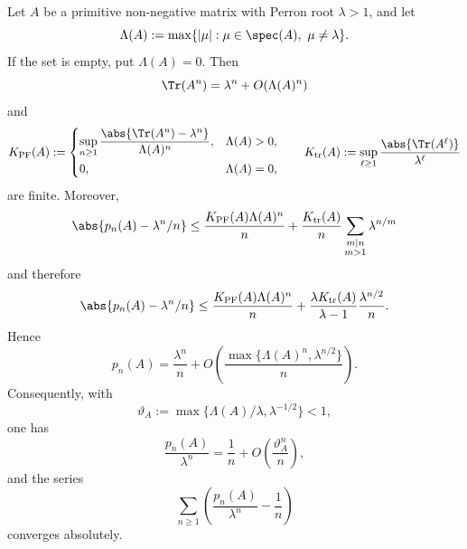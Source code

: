 \begin{lemma}
  \label{lem:primitive-orbit-asymptotic}
  Let \(A\) be a primitive non-negative matrix with Perron root
  \(\lambda>1\), and let
  \[
    \Lambda(A):=\max\{|\mu|:\mu\in\spec(A),\ \mu\neq\lambda\}.
  \]
  If the set is empty, put \(\Lambda(A)=0\).
  Then
  \[
    \Tr(A^n)=\lambda^n+O(\Lambda(A)^n)
  \]
  and
  \[
    K_{\mathrm{PF}}(A)
    :=
    \begin{cases}
      \displaystyle
      \sup_{n\ge 1}
        \frac{\abs{\Tr(A^n)-\lambda^n}}{\Lambda(A)^n},
      & \Lambda(A)>0, \\[2ex]
      0,
      & \Lambda(A)=0,
    \end{cases}
    \qquad
    K_{\mathrm{tr}}(A)
    :=
    \sup_{\ell\ge 1}\frac{\abs{\Tr(A^\ell)}}{\lambda^\ell}
  \]
  are finite. Moreover,
  \[
    \abs{p_n(A)-\lambda^n/n}
    \le
    \frac{K_{\mathrm{PF}}(A)\Lambda(A)^n}{n}
    +\frac{K_{\mathrm{tr}}(A)}{n}
      \sum_{\substack{m\mid n\\ m>1}}\lambda^{n/m}
  \]
  and therefore
  \[
    \abs{p_n(A)-\lambda^n/n}
    \le
    \frac{K_{\mathrm{PF}}(A)\Lambda(A)^n}{n}
    +\frac{\lambda K_{\mathrm{tr}}(A)}{\lambda-1}
      \frac{\lambda^{n/2}}{n}.
  \]
  Hence
  \[
    p_n(A)
    =
    \frac{\lambda^n}{n}
    +O\!\left(
      \frac{\max\{\Lambda(A)^n,\lambda^{n/2}\}}{n}
    \right).
  \]
  Consequently, with
  \[
    \vartheta_A:=\max\{\Lambda(A)/\lambda,\lambda^{-1/2}\}<1,
  \]
  one has
  \[
    \frac{p_n(A)}{\lambda^n}
    =
    \frac{1}{n}+O\!\left(\frac{\vartheta_A^n}{n}\right),
  \]
  and the series
  \[
    \sum_{n\ge 1}
      \left(\frac{p_n(A)}{\lambda^n}-\frac{1}{n}\right)
  \]
  converges absolutely.
\end{lemma}

